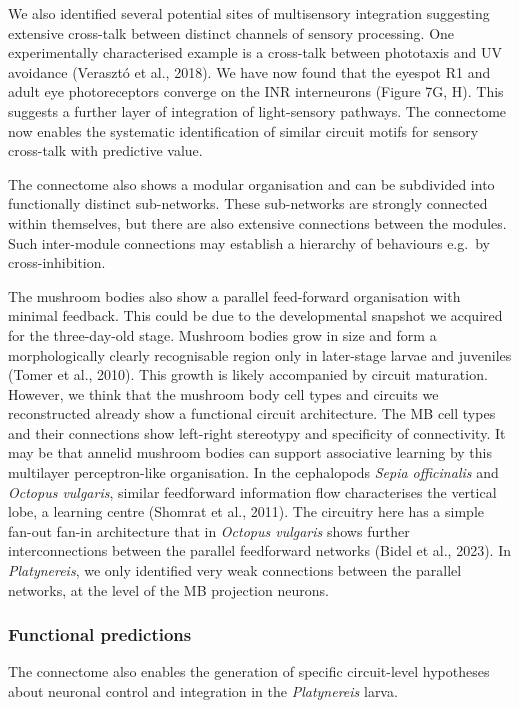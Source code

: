 \documentclass[
  11pt,
]{article}
\begin{document}
We also identified several potential sites of multisensory integration
suggesting extensive cross-talk between distinct channels of sensory
processing. One experimentally characterised example is a cross-talk
between phototaxis and UV avoidance (Verasztó et al., 2018). We have now
found that the eyespot R1 and adult eye photoreceptors converge on the
INR interneurons (Figure 7G, H). This suggests a further layer of
integration of light-sensory pathways. The connectome now enables the
systematic identification of similar circuit motifs for sensory
cross-talk with predictive value.

The connectome also shows a modular organisation and can be subdivided
into functionally distinct sub-networks. These sub-networks are strongly
connected within themselves, but there are also extensive connections
between the modules. Such inter-module connections may establish a
hierarchy of behaviours e.g.~by cross-inhibition.

The mushroom bodies also show a parallel feed-forward organisation with
minimal feedback. This could be due to the developmental snapshot we
acquired for the three-day-old stage. Mushroom bodies grow in size and
form a morphologically clearly recognisable region only in later-stage
larvae and juveniles (Tomer et al., 2010). This growth is likely
accompanied by circuit maturation. However, we think that the mushroom
body cell types and circuits we reconstructed already show a functional
circuit architecture. The MB cell types and their connections show
left-right stereotypy and specificity of connectivity. It may be that
annelid mushroom bodies can support associative learning by this
multilayer perceptron-like organisation. In the cephalopods \emph{Sepia
officinalis} and \emph{Octopus vulgaris}, similar feedforward
information flow characterises the vertical lobe, a learning centre
(Shomrat et al., 2011). The circuitry here has a simple fan-out fan-in
architecture that in \emph{Octopus vulgaris} shows further
interconnections between the parallel feedforward networks (Bidel et
al., 2023). In \emph{Platynereis}, we only identified very weak
connections between the parallel networks, at the level of the MB
projection neurons.

\subsubsection{Functional predictions}\label{functional-predictions}

The connectome also enables the generation of specific circuit-level
hypotheses about neuronal control and integration in the
\emph{Platynereis} larva.
\end{document}
